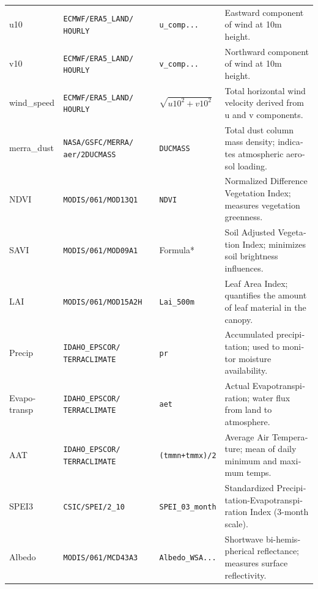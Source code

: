 \documentclass[12pt,a4paper]{article}
\begin{document}
\begin{latin}
\begin{latin}
{\begin{longtable}{@{}P{2.2cm} P{4.2cm} P{3.0cm} P{6.0cm}@{}}
u10 & \texttt{ECMWF/ERA5\_LAND/ HOURLY} & \texttt{u\_comp...} & Eastward component of wind at 10m height. \\ \addlinespace

v10 & \texttt{ECMWF/ERA5\_LAND/ HOURLY} & \texttt{v\_comp...} & Northward component of wind at 10m height. \\ \addlinespace

wind\_speed & \texttt{ECMWF/ERA5\_LAND/ HOURLY} & $\sqrt{u10^2 + v10^2}$ & Total horizontal wind velocity derived from u and v components. \\ \addlinespace

merra\_dust & \texttt{NASA/GSFC/MERRA/ aer/2DUCMASS} & \texttt{DUCMASS} & Total dust column mass density; indicates atmospheric aerosol loading. \\ \addlinespace

NDVI & \texttt{MODIS/061/MOD13Q1} & \texttt{NDVI} & Normalized Difference Vegetation Index; measures vegetation greenness. \\ \addlinespace

SAVI & \texttt{MODIS/061/MOD09A1} & Formula* & Soil Adjusted Vegetation Index; minimizes soil brightness influences. \\ \addlinespace

LAI & \texttt{MODIS/061/MOD15A2H} & \texttt{Lai\_500m} & Leaf Area Index; quantifies the amount of leaf material in the canopy. \\ \addlinespace

Precip & \texttt{IDAHO\_EPSCOR/ TERRACLIMATE} & \texttt{pr} & Accumulated precipitation; used to monitor moisture availability. \\ \addlinespace

Evapotransp & \texttt{IDAHO\_EPSCOR/ TERRACLIMATE} & \texttt{aet} & Actual Evapotranspiration; water flux from land to atmosphere. \\ \addlinespace

AAT & \texttt{IDAHO\_EPSCOR/ TERRACLIMATE} & \texttt{(tmmn+tmmx)/2} & Average Air Temperature; mean of daily minimum and maximum temps. \\ \addlinespace

SPEI3 & \texttt{CSIC/SPEI/2\_10} & \texttt{SPEI\_03\_month} & Standardized Precipitation-Evapotranspiration Index (3-month scale). \\ \addlinespace

Albedo & \texttt{MODIS/061/MCD43A3} & \texttt{Albedo\_WSA...} & Shortwave bi-hemispherical reflectance; measures surface reflectivity. \\


\end{longtable}}
\end{latin}
\end{latin}
\end{document}
